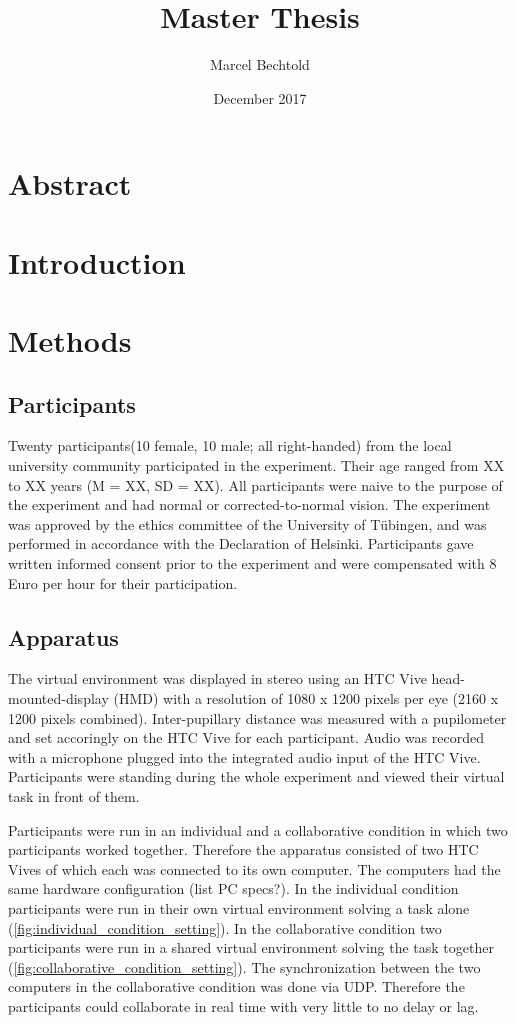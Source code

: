 \documentclass{article}
\title{Master Thesis}
\author{Marcel Bechtold}
\date{December 2017}
\begin{document}
\maketitle


\section{Abstract}

\section{Introduction}


\section{Methods}

\subsection{Participants}
Twenty participants(10 female, 10 male; all right-handed) from the local university community participated in the experiment. Their age ranged from XX to XX years (M = XX, SD = XX). All participants were naive to the purpose of the experiment and had normal or corrected-to-normal vision. The experiment was approved by the ethics committee of the University of T\"ubingen, and was performed in accordance with the Declaration of Helsinki. Participants gave written informed consent prior to the experiment and were compensated with 8 Euro per hour for their participation. 

\subsection{Apparatus}
The virtual environment was displayed in stereo using an HTC Vive head-mounted-display (HMD) with a resolution of 1080 x 1200 pixels per eye (2160 x 1200 pixels combined). Inter-pupillary distance was measured with a pupilometer and set accoringly on the HTC Vive for each participant. Audio was recorded with a microphone plugged into the integrated audio input of the HTC Vive. Participants were standing during the whole experiment and viewed their virtual task in front of them.

Participants were run in an individual and a collaborative condition in which two participants worked together. Therefore the apparatus consisted of two HTC Vives of which each was connected to its own computer. The computers had the same hardware configuration (list PC specs?). In the individual condition participants were run in their own virtual environment solving a task alone (\ref{fig:individual_condition_setting}). In the collaborative condition two participants were run in a shared virtual environment solving the task together (\ref{fig:collaborative_condition_setting}). The synchronization between the two computers in the collaborative condition was done via UDP. Therefore the participants could collaborate in real time with very little to no delay or lag.
\end{document}
